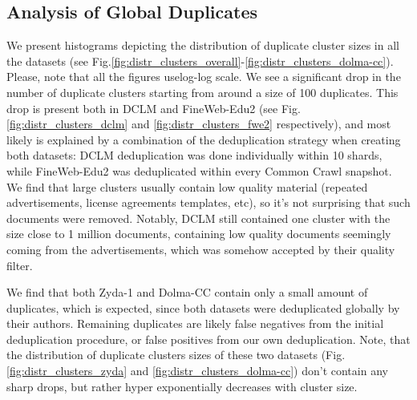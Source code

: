 \documentclass[conference]{IEEEtran}
\begin{document}
\subsection{Analysis of Global Duplicates}
We present histograms depicting the distribution of duplicate cluster sizes in all the datasets (see Fig.\ref{fig:distr_clusters_overall}-\ref{fig:distr_clusters_dolma-cc}). Please, note that all the figures uselog-log scale. We see a significant drop in the number of duplicate clusters starting from around a size of 100 duplicates. This drop is present both in DCLM and FineWeb-Edu2 (see Fig. \ref{fig:distr_clusters_dclm} and \ref{fig:distr_clusters_fwe2} respectively), and most likely is explained by a combination of the deduplication strategy when creating both datasets: DCLM deduplication was done individually within 10 shards, while FineWeb-Edu2 was deduplicated within every Common Crawl snapshot. We find that large clusters usually contain low quality material (repeated advertisements, license agreements templates, etc), so it’s not surprising that such documents were removed. Notably, DCLM still contained one cluster with the size close to 1 million documents, containing low quality documents seemingly coming from the advertisements, which was somehow accepted by their quality filter.

We find that both Zyda-1 and Dolma-CC contain only a small amount of duplicates, which is expected, since both datasets were deduplicated globally by their authors. Remaining duplicates are likely false negatives from the initial deduplication procedure, or false positives from our own deduplication. Note, that the distribution of duplicate clusters sizes of these two datasets (Fig. \ref{fig:distr_clusters_zyda} and \ref{fig:distr_clusters_dolma-cc}) don’t contain any sharp drops, but rather hyper exponentially decreases with cluster size. 
\end{document}
